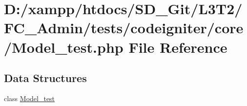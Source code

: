 \hypertarget{_model__test_8php}{}\section{D\+:/xampp/htdocs/\+S\+D\+\_\+\+Git/\+L3\+T2/\+F\+C\+\_\+\+Admin/tests/codeigniter/core/\+Model\+\_\+test.php File Reference}
\label{_model__test_8php}
\subsection*{Data Structures}
\begin{DoxyCompactItemize}
\item 
class \hyperlink{class_model__test}{Model\+\_\+test}
\end{DoxyCompactItemize}
